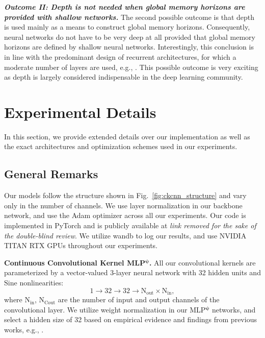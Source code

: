 \documentclass{article}
\def\Nt{\mathrm{N}}
\newcommand{\mlp}{{\btt MLP}}
\begin{document}
\textbf{\textit{Outcome II: Depth is not needed when global memory horizons are provided with shallow networks.}} The second possible outcome is that depth is used mainly as a means to construct global memory horizons. Consequently, neural networks do not have to be very deep at all provided that global memory horizons are defined by shallow neural networks. Interestingly, this conclusion is in line with the predominant design of recurrent architectures, for which a moderate number of layers are used, e.g., \cite{pascanu2013construct, graves2013speech, gu2020improving, gu2020hippo}. This possible outcome is very exciting as depth is largely considered indispensable in the deep learning community.


\section{Experimental Details}\label{appx:expdetails}
In this section, we provide extended details over our implementation as well as the exact architectures and optimization schemes used in our experiments.

\subsection{General Remarks}
 Our models follow the structure shown in Fig.~\ref{fig:ckcnn_structure} and vary only in the number of channels. We use layer normalization \citep{ba2016layer} in our backbone network, and use the Adam optimizer \citep{kingma2014adam} across all our experiments. Our code is implemented in {\btt PyTorch} and is publicly available at \textit{link removed for the sake of the double-blind review}.
We utilize {\btt wandb} \citep{wandb} to log our results, and use NVIDIA TITAN RTX GPUs throughout our experiments. 

\textbf{Continuous Convolutional Kernel \mlp$^{\boldsymbol{\psi}}$.}
All our convolutional kernels are parameterized by a vector-valued 3-layer neural network with 32 hidden units and $\mathrm{Sine}$ nonlinearities: 
$$1 \rightarrow 32 \rightarrow 32 \rightarrow \Nt_{\mathrm{out}} \times \Nt_{\mathrm{in}},$$
where $\Nt_{\mathrm{in}}$, $\Nt_{\mathrm{Cout}}$ are the number of input and output channels of the convolutional layer. We utilize weight normalization \citep{salimans2016weight} in our \mlp$^{\boldsymbol{\psi}}$ networks, and select a hidden size of 32 based on empirical evidence and findings from previous works, e.g., \cite{finzi2020generalizing}.
\end{document}
